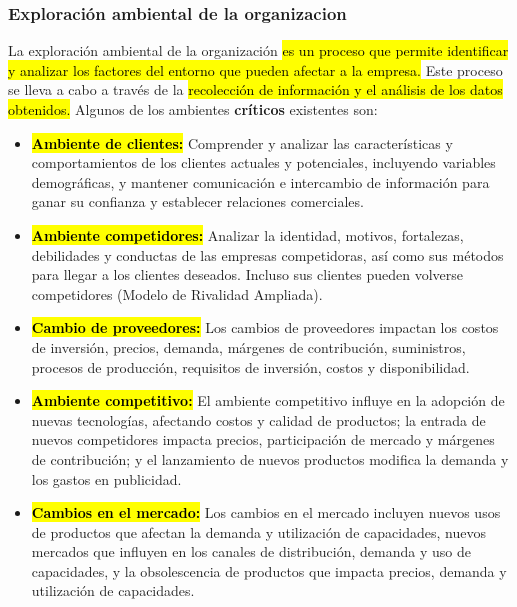 \documentclass{templateNote}
\newcommand{\hlcolor}[2]{{\sethlcolor{#1}\hl{#2}}}
\begin{document}
\subsubsection{Exploración ambiental de la organizacion}
\noindent La exploración ambiental de la organización \hlcolor{Verde}{es un proceso que permite identificar y analizar los factores del entorno que pueden afectar a la empresa.}
Este proceso se lleva a cabo a través de la \hlcolor{Verde}{recolección de información y el análisis de los datos obtenidos.} Algunos de los ambientes \textbf{críticos} existentes son:
\begin{itemize}
    \item \hlcolor{Verde}{\textbf{Ambiente de clientes:}} Comprender y analizar las características y comportamientos de los clientes actuales y potenciales, incluyendo variables demográficas, y mantener comunicación e intercambio de información para ganar su confianza y establecer relaciones comerciales.
    
    \item \hlcolor{Verde}{\textbf{Ambiente competidores:}} Analizar la identidad, motivos, fortalezas, debilidades y conductas de las empresas competidoras, así como sus métodos para llegar a los clientes deseados. Incluso sus clientes pueden volverse competidores (Modelo de Rivalidad Ampliada).
    
    \item \hlcolor{Verde}{\textbf{Cambio de proveedores:}} Los cambios de proveedores impactan los costos de inversión, precios, demanda, márgenes de contribución, suministros, procesos de producción, requisitos de inversión, costos y disponibilidad.
    
    \item \hlcolor{Verde}{\textbf{Ambiente competitivo:}} El ambiente competitivo influye en la adopción de nuevas tecnologías, afectando costos y calidad de productos; la entrada de nuevos competidores impacta precios, participación de mercado y márgenes de contribución; y el lanzamiento de nuevos productos modifica la demanda y los gastos en publicidad.
    
    \item \hlcolor{Verde}{\textbf{Cambios en el mercado:}} Los cambios en el mercado incluyen nuevos usos de productos que afectan la demanda y utilización de capacidades, nuevos mercados que influyen en los canales de distribución, demanda y uso de capacidades, y la obsolescencia de productos que impacta precios, demanda y utilización de capacidades.
    

\end{itemize}
\end{document}
